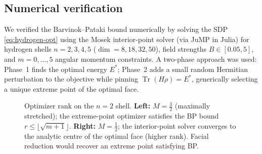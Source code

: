 \documentclass[11pt,a4paper]{article}
\theoremstyle{definition}
\newcommand{\Tr}{\operatorname{Tr}}
\begin{document}
\subsection{Numerical verification}

We verified the Barvinok--Pataki bound numerically by solving the SDP
\eqref{eq:hydrogen-opt} using the Mosek interior-point solver (via
JuMP in Julia) for hydrogen shells $n = 2, 3, 4, 5$
($\dim = 8, 18, 32, 50$), field strengths $B \in [0.05, 5]$, and
$m = 0, \ldots, 5$ angular momentum constraints.  A two-phase
approach was used: Phase~1 finds the optimal energy $E^*$; Phase~2
adds a small random Hermitian perturbation to the objective while
pinning $\Tr(H\rho) = E^*$, generically selecting a unique extreme
point of the optimal face.

\begin{figure}[htbp]
\centering
{}
\caption{Optimizer rank on the $n=2$ shell.
\textbf{Left:} $M=\tfrac{3}{2}$ (maximally stretched); the extreme-point
optimizer satisfies the BP bound $r \leq \lfloor\sqrt{m+1}\rfloor$.
\textbf{Right:} $M=\tfrac{1}{2}$; the interior-point solver converges to the
analytic centre of the optimal face (higher rank).  Facial reduction
would recover an extreme point satisfying BP.}
\label{fig:rank-vs-m}
\end{figure}
\end{document}
